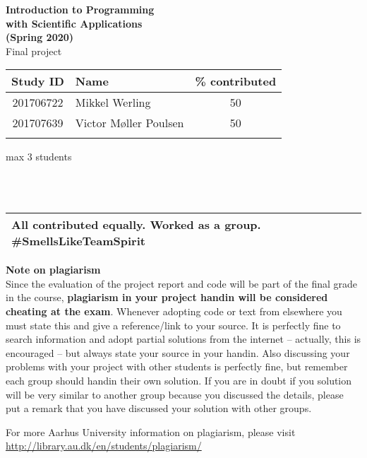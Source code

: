 \documentclass[a4paper, 11pt]{report}
\begin{document}

\thispagestyle{empty}
\setcounter{page}{0}

\begin{center}
  \huge
  \textbf{Introduction to Programming \\
  with Scientific Applications \\
  (Spring 2020)} \\[2ex]
  Final project \\[2cm]
\end{center}
\noindent
\begin{tabularx}{\textwidth}{|c|X|c|}
\multicolumn{1}{c}{Study ID} & 
\multicolumn{1}{l}{Name} & 
\multicolumn{1}{l}{\% contributed} \\
\hline
201706722 & Mikkel Werling & 50 \\ %
\hline 
201707639 & Victor Møller Poulsen & 50 \\ %
\hline
& & \\ %
\hline
\end{tabularx}
\centerline{max 3 students}
\\[5ex]
\noindent
\\
\begin{tabularx}{\textwidth}{|X|}
\hline

All contributed equally. 
Worked as a group. 
\#SmellsLikeTeamSpirit

\\[3cm]
\hline 
\end{tabularx}


\vfill
\noindent
\textbf{Note on plagiarism} 
\\[2ex]
Since the evaluation of the project report and code will be part of the final grade in the course, \textbf{plagiarism in your project handin will be considered cheating at the exam}. Whenever adopting code or text from elsewhere you must state this and give a reference/link to your source. It is perfectly fine to search information and adopt partial solutions from the internet – actually, this is encouraged – but always state your source in your handin. Also discussing your problems with your project with other students is perfectly fine, but remember each group should handin their own solution. If you are in doubt if you solution will be very similar to another group because you discussed the details, please put a remark that you have discussed your solution with other groups.

\begin{raggedleft}

For more Aarhus University information on plagiarism, please visit \\
\url{http://library.au.dk/en/students/plagiarism/}

\end{raggedleft}


\newpage
\end{document}
